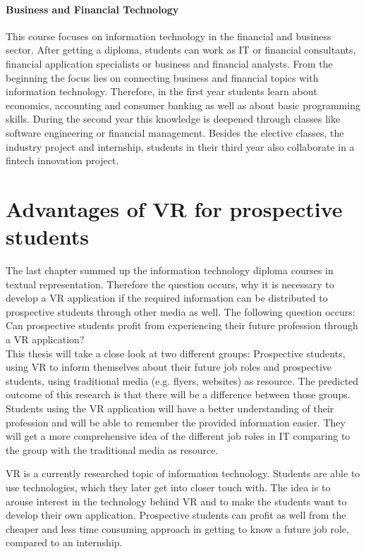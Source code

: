\paragraph{Business and Financial Technology}
This course focuses on information technology in the financial and business sector. After getting a diploma, students can work as IT or financial consultants, financial application specialists or business and financial analysts. From the beginning the focus lies on connecting business and financial topics with information technology. Therefore, in the first year students learn about economics, accounting and consumer banking as well as about basic programming skills. During the second year this knowledge is deepened through classes like software engineering or financial management. Besides the elective classes, the industry project and internship, students in their third year also collaborate in a fintech innovation project.

\section{Advantages of VR for prospective students}
The last chapter summed up the information technology diploma courses in textual representation. Therefore the question occurs, why it is necessary to develop a VR application if the required information can be distributed to prospective students through other media as well. The following question occurs: Can prospective students profit from experiencing their future profession through a VR application? \\
This thesis will take a close look at two different groups: Prospective students, using VR to inform themselves about their future job roles and prospective students, using traditional media (e.g. flyers, websites) as resource.
The predicted outcome of this research is that there will be a difference between those groups. Students using the VR application will have a better understanding of their profession and will be able to remember the provided information easier. They will get a more comprehensive idea of the different job roles in IT  comparing to the group with the traditional media as resource.

VR is a currently researched topic of information technology. Students are able to use technologies, which they later get into closer touch with. The idea is to arouse interest in the technology behind VR and to make the students want to develop their own application. Prospective students can profit as well from the cheaper and less time consuming approach in getting to know a future job role, compared to an internship. 
